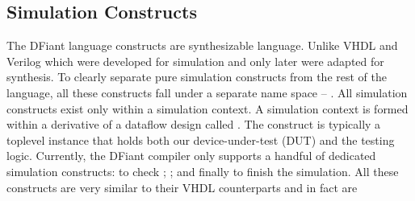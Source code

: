 \subsection{Simulation Constructs}
\label{sec:simulation}
The DFiant language constructs are  synthesizable language. Unlike VHDL and Verilog which were developed for simulation and only later were adapted for synthesis.
To clearly separate pure simulation constructs from the rest of the language, all these constructs fall under a separate name space -- . All simulation constructs exist only within a simulation context. A simulation context is formed within a derivative of a dataflow design called . The  construct is typically a toplevel instance that holds both our device-under-test (DUT) and the testing logic. Currently, the DFiant compiler only supports a handful of dedicated simulation constructs:
 to check ; ; and finally  to finish the simulation. All these constructs are very similar to their VHDL counterparts and in fact are


